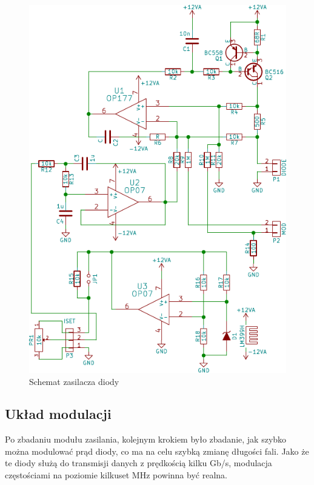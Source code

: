 \documentclass[a4paper,10pt]{article}
\begin{document}
\begin{figure}
\begin{center}
 \includegraphics{./obrazki/VcselPSU.pdf}
\end{center}
\caption{Schemat zasilacza diody}
\label{sch-psu}
\end{figure}

\subsection{Układ modulacji}

Po zbadaniu modułu zasilania, kolejnym krokiem było zbadanie, jak szybko można modulować prąd diody, co ma na celu szybką zmianę długości fali. Jako że te diody służą do transmisji danych z prędkością kilku Gb/s, modulacja częstościami na poziomie kilkuset MHz powinna być realna. 
\end{document}
